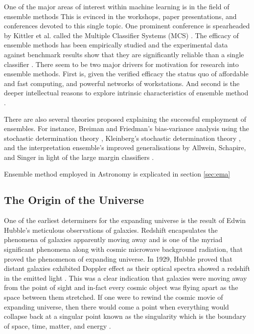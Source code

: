 One of the major areas of interest within machine learning is in the field of ensemble methods \parencites{dietterich_experimental_2000, kuncheva_combining_2014} This is evinced in the workshops, paper presentations, and conferences devoted to this single topic. One prominent conference is spearheaded by Kittler et al. called the Multiple Classifier Systems (MCS) \parencites{guyer_cambridge_1992, benediktsson_multiple_2009, roli_multiple_2004, oza_multiple_2005, haindl_multiple_2007}. The efficacy of ensemble methods has been empirically studied and the experimental data against benchmark results show that they are significantly reliable than a single classifier \parencites{banfield_comparison_2007, dietterich_experimental_2000, sohn_experimental_2007}. There seem to be two major drivers for motivation for research into ensemble methods. First is, given the verified efficacy the status quo of affordable and fast computing, and powerful networks of workstations. And second is the deeper intellectual reasons to explore intrinsic characteristics of ensemble method \parencite[564]{way_advances_2012}.

There are also several theories proposed explaining the successful employment of ensembles. For instance, Breiman and Friedman's bias-variance analysis using the stochastic determination theory \parencite{breiman_bias_1996}, Kleinberg's stochastic determination theory \parencite{kleinberg_algorithmic_2000}, and the interpretation ensemble's improved generalisations by Allwein, Schapire, and Singer in light of the large margin classifiers \parencite{allwein_reducing_2001}.

Ensemble method employed in Astronomy is explicated in section \ref{sec:ema}

\subsection{The Origin of the Universe}
One of the earliest determiners for the expanding universe is the result of Edwin Hubble's meticulous observations of galaxies. Redshift encapsulates the phenomena of galaxies apparently moving away and is one of the myriad significant phenomena along with cosmic microwave background radiation, that proved the phenomenon of expanding universe. In 1929, Hubble proved that distant galaxies exhibited Doppler effect as their optical spectra showed a redshift in the emitted light \parencite*{hubble_relation_1929}. This was a clear indication that galaxies were moving away from the point of sight and in-fact every cosmic object was flying apart as the space between them stretched. If one were to rewind the cosmic movie of expanding universe, then there would come a point when everything would collapse back at a singular point known as the singularity which is the boundary of space, time, matter, and energy \parencites[18]{craig_ultimate_1999, davies_god_2007}.

